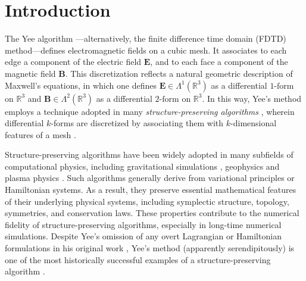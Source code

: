 \documentclass[final,twocolumn]{elsarticle}
\newcommand{\w}[1]{\ensuremath{\mathbf{#1}}} %
\newcommand*\mR{\mathbb{R}}
\newcommand*\md{\mathrm{d}}
\newcommand{\cmmnt}[1]{\ignorespaces} %
\begin{document}
\section{Introduction}

\cmmnt{
A Hamiltonian formulation of Maxwell's equations

Maxwell's equations in vacuum can be compactly expressed in the notation of differential forms as
\begin{eqn}
\md F=0\hspace{36pt}\md\star F=0.
\end{eqn}
Here, ${F=\md A}$ denotes the electromagnetic tensor, a $\text{2-form}$ defined in flat $\mR^4$ spacetime in terms of the electromagnetic four-potential ${A^\alpha=(\phi,\w{A})}$ such that
\begin{eqn}
F&=\frac{1}{2}F_{\mu\nu}\md x^\mu\wedge\md x^\nu=\w{E}\\
\md A&=\md\big(A_\alpha\md x^\alpha\big)\\
&=\partial_t
\end{eqn}
}

The Yee algorithm \cite{yee_numerical_1966,taflove_computational_2005}---alternatively, the finite difference time domain (FDTD) method---defines electromagnetic fields on a cubic mesh. It associates to each edge a component of the electric field $\w{E}$, and to each face a component of the magnetic field $\w{B}$. This discretization reflects a natural geometric description of Maxwell's equations, in which one defines ${\w{E}\in\Lambda^1(\mR^3)}$ as a differential $\text{1-form}$ on $\mR^3$ and ${\w{B}\in\Lambda^2(\mR^3)}$ as a differential $\text{2-form}$ on $\mR^3$. In this way, Yee's method employs a technique adopted in many \emph{structure-preserving algorithms} \cite{hairer_geometric_2006}, wherein differential $k$-forms are discretized by associating them with $k$-dimensional features of a mesh \cite{whitney_geometric_1957,desbrun_discrete_2005,arnold_finite_2006,arnold_finite_2010}.

Structure-preserving algorithms have been widely adopted in many subfields of computational physics, including gravitational simulations  \cite{kinoshita_symplectic_1991,gladman_symplectic_1991,chambers_symplectic_2002,bravetti_numerical_2020,kur_discrete_2022}, geophysics \cite{li_structure-preserving_2012,liu_modified_2015} and plasma physics \cite{squire_geometric_2012,xiao_explicit_2015,he_hamiltonian_2015,crouseilles2015Hamiltonian,qin_canonical_2016,kraus_gempic:_2017,morrison_structure_2017,glasser_geometric_2020,glasser_gauge-compatible_2022}. Such algorithms generally derive from variational principles or Hamiltonian systems. As a result, they preserve essential mathematical features of their underlying physical systems, including symplectic structure, topology, symmetries, and conservation laws. These properties contribute to the numerical fidelity of structure-preserving algorithms, especially in long-time numerical simulations. Despite Yee's omission of any overt Lagrangian or Hamiltonian formulations in his original work \cite{yee_numerical_1966}, Yee's method (apparently serendipitously) is one of the most historically successful examples of a structure-preserving algorithm \cite{stern_geometric_2009}.
\end{document}
